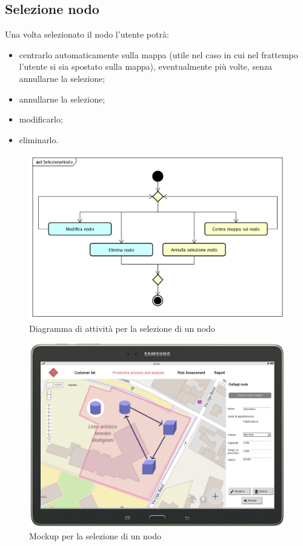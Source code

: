 \newpage
\subsection{Selezione nodo}
Una volta selezionato il nodo l'utente potrà:
\begin{itemize}
	\item centrarlo automaticamente sulla mappa (utile nel caso in cui nel frattempo l'utente si sia spostato sulla mappa), eventualmente più volte, senza annullarne la selezione;
	\item annullarne la selezione;
	\item modificarlo;
	\item eliminarlo.
\end{itemize}
\begin{figure}[H]
	\centering
	\includegraphics[width=\textwidth]{img/DiagrammiDiAttivita/SelezioneNodo.png}
	\caption{Diagramma di attività per la selezione di un nodo}
\end{figure}
\begin{figure}[H]
	\centering
	\includegraphics[width=\textwidth]{img/MockUp/m13.png}
	\caption{Mockup per la selezione di un nodo}
\end{figure}


